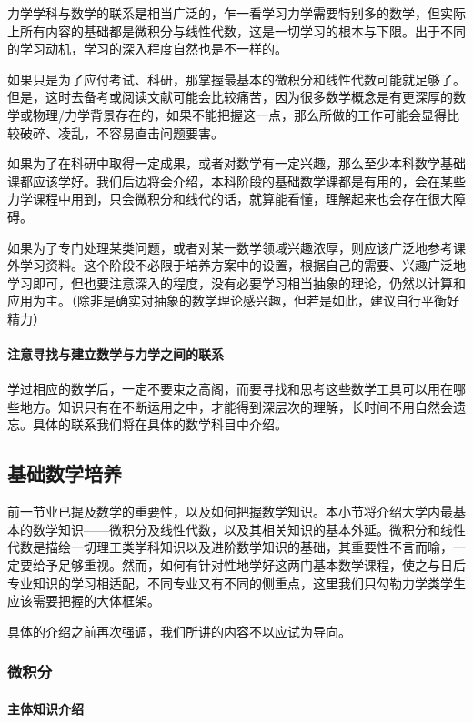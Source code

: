 力学学科与数学的联系是相当广泛的，乍一看学习力学需要特别多的数学，但实际上所有内容的基础都是微积分与线性代数，这是一切学习的根本与下限。出于不同的学习动机，学习的深入程度自然也是不一样的。

如果只是为了应付考试、科研，那掌握最基本的微积分和线性代数可能就足够了。但是，这时去备考或阅读文献可能会比较痛苦，因为很多数学概念是有更深厚的数学或物理/力学背景存在的，如果不能把握这一点，那么所做的工作可能会显得比较破碎、凌乱，不容易直击问题要害。

如果为了在科研中取得一定成果，或者对数学有一定兴趣，那么至少本科数学基础课都应该学好。我们后边将会介绍，本科阶段的基础数学课都是有用的，会在某些力学课程中用到，只会微积分和线代的话，就算能看懂，理解起来也会存在很大障碍。

如果为了专门处理某类问题，或者对某一数学领域兴趣浓厚，则应该广泛地参考课外学习资料。这个阶段不必限于培养方案中的设置，根据自己的需要、兴趣广泛地学习即可，但也要注意深入的程度，没有必要学习相当抽象的理论，仍然以计算和应用为主。（除非是确实对抽象的数学理论感兴趣，但若是如此，建议自行平衡好精力）

\paragraph{注意寻找与建立数学与力学之间的联系}

学过相应的数学后，一定不要束之高阁，而要寻找和思考这些数学工具可以用在哪些地方。知识只有在不断运用之中，才能得到深层次的理解，长时间不用自然会遗忘。具体的联系我们将在具体的数学科目中介绍。

\subsection{基础数学培养}

前一节业已提及数学的重要性，以及如何把握数学知识。本小节将介绍大学内最基本的数学知识——微积分及线性代数，以及其相关知识的基本外延。微积分和线性代数是描绘一切理工类学科知识以及进阶数学知识的基础，其重要性不言而喻，一定要给予足够重视。然而，如何有针对性地学好这两门基本数学课程，使之与日后专业知识的学习相适配，不同专业又有不同的侧重点，这里我们只勾勒力学类学生应该需要把握的大体框架。

具体的介绍之前再次强调，我们所讲的内容不以应试为导向。

\subsubsection{微积分}

\paragraph{主体知识介绍}

